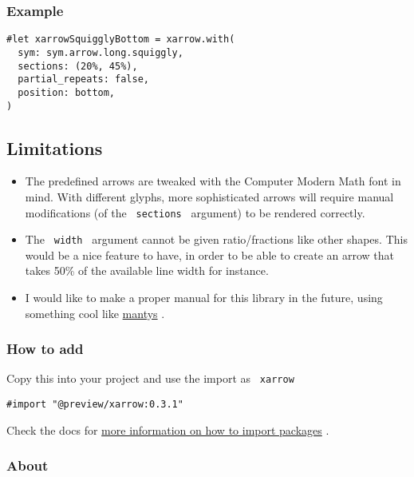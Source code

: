 \subsubsection{Example}\label{example-1}

\begin{verbatim}
#let xarrowSquigglyBottom = xarrow.with(
  sym: sym.arrow.long.squiggly,
  sections: (20%, 45%),
  partial_repeats: false,
  position: bottom,
)
\end{verbatim}

\subsection{Limitations}\label{limitations}

\begin{itemize}
\tightlist
\item
  The predefined arrows are tweaked with the Computer Modern Math font
  in mind. With different glyphs, more sophisticated arrows will require
  manual modifications (of the \texttt{\ sections\ } argument) to be
  rendered correctly.
\item
  The \texttt{\ width\ } argument cannot be given ratio/fractions like
  other shapes. This would be a nice feature to have, in order to be
  able to create an arrow that takes 50\% of the available line width
  for instance.
\item
  I would like to make a proper manual for this library in the future,
  using something cool like
  \href{https://github.com/jneug/typst-mantys}{mantys} .
\end{itemize}

\subsubsection{How to add}\label{how-to-add}

Copy this into your project and use the import as \texttt{\ xarrow\ }

\begin{verbatim}
#import "@preview/xarrow:0.3.1"
\end{verbatim}



Check the docs for
\href{https://typst.app/docs/reference/scripting/\#packages}{more
information on how to import packages} .

\subsubsection{About}\label{about}

